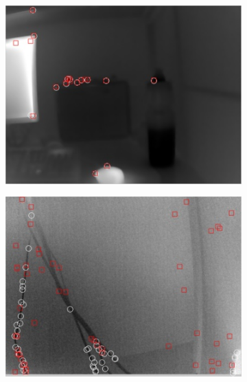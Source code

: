 \begin{figure}
	\begin{subfigure}{0.49\columnwidth}
    \centering
    \includegraphics[width=1.00\textwidth]{media/V_C_highsnrcornersori.jpg}
    	\caption{}
		\label{fig:imgprocessing_3}
  \end{subfigure}
	\begin{subfigure}{0.49\columnwidth}
    \centering
    \includegraphics[width=1.00\textwidth]{media/V_C_lowsnrcornersori.jpg}
		\caption{}
		\label{fig:imgprocessing_4}
  \end{subfigure} \vspace{10pt} \\ 
	\begin{subfigure}{0.49\columnwidth}
    \centering

\end{subfigure}
\end{figure}
